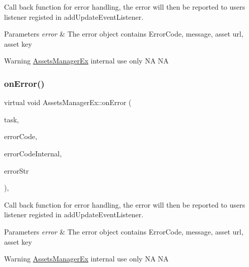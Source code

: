 Call back function for error handling, the error will then be reported to user\textquotesingle{}s listener registed in add\+Update\+Event\+Listener. 


\begin{DoxyParams}{Parameters}
{\em error} & The error object contains Error\+Code, message, asset url, asset key \\
\hline
\end{DoxyParams}
\begin{DoxyWarning}{Warning}
\hyperlink{classAssetsManagerEx}{Assets\+Manager\+Ex} internal use only  NA  NA 
\end{DoxyWarning}
\mbox{\label{classAssetsManagerEx_a95466efda302ece8afeaea7853699728}} 
\subsubsection{\texorpdfstring{on\+Error()}{onError()}\hspace{0.1cm}{\footnotesize\ttfamily [2/2]}}
{\footnotesize\ttfamily virtual void Assets\+Manager\+Ex\+::on\+Error (\begin{DoxyParamCaption}\item[{const network\+::\+Download\+Task \&}]{task,  }\item[{int}]{error\+Code,  }\item[{int}]{error\+Code\+Internal,  }\item[{const std\+::string \&}]{error\+Str }\end{DoxyParamCaption})\hspace{0.3cm}{\ttfamily [protected]}, {\ttfamily [virtual]}}



Call back function for error handling, the error will then be reported to user\textquotesingle{}s listener registed in add\+Update\+Event\+Listener. 


\begin{DoxyParams}{Parameters}
{\em error} & The error object contains Error\+Code, message, asset url, asset key \\
\hline
\end{DoxyParams}
\begin{DoxyWarning}{Warning}
\hyperlink{classAssetsManagerEx}{Assets\+Manager\+Ex} internal use only  NA  NA 
\end{DoxyWarning}
\mbox{\label{classAssetsManagerEx_ac7bb9bd198851b443ea85735daa9d74a}} 
